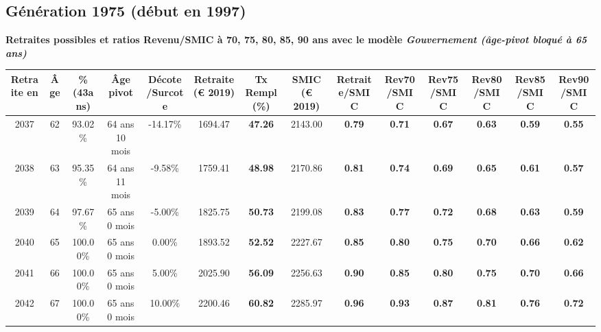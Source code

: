 \subsection{Génération 1975 (début en 1997)} 

{\bf \noindent Retraites possibles et ratios Revenu/SMIC à 70, 75, 80, 85, 90 ans avec le modèle \emph{Gouvernement (âge-pivot bloqué à 65 ans)}}  
 
\begin{adjustbox}{max width=\textwidth} 
\begin{tabular}[htb]{|c|c||c|c|c||c|c||c||c|c|c|c|c|c|} 
\hline 
 Retraite en &  Âge &  \%(43ans) &  Âge pivot &  Décote/Surcote &  Retraite (\euro{} 2019) &  Tx Rempl(\%) &  SMIC (\euro{} 2019) &  Retraite/SMIC &  Rev70/SMIC &  Rev75/SMIC &  Rev80/SMIC &  Rev85/SMIC &  Rev90/SMIC \\ 
\hline \hline 
 2037 &  62 &  93.02\% &  64 ans 10 mois &  -14.17\% &  1694.47 &  {\bf 47.26} &  2143.00 &  {\bf {\color{red} 0.79}} &  {\bf {\color{red} 0.71}} &  {\bf {\color{red} 0.67}} &  {\bf {\color{red} 0.63}} &  {\bf {\color{red} 0.59}} &  {\bf {\color{red} 0.55}} \\ 
\hline 
 2038 &  63 &  95.35\% &  64 ans 11 mois &  -9.58\% &  1759.41 &  {\bf 48.98} &  2170.86 &  {\bf {\color{red} 0.81}} &  {\bf {\color{red} 0.74}} &  {\bf {\color{red} 0.69}} &  {\bf {\color{red} 0.65}} &  {\bf {\color{red} 0.61}} &  {\bf {\color{red} 0.57}} \\ 
\hline 
 2039 &  64 &  97.67\% &  65 ans 0 mois &  -5.00\% &  1825.75 &  {\bf 50.73} &  2199.08 &  {\bf {\color{red} 0.83}} &  {\bf {\color{red} 0.77}} &  {\bf {\color{red} 0.72}} &  {\bf {\color{red} 0.68}} &  {\bf {\color{red} 0.63}} &  {\bf {\color{red} 0.59}} \\ 
\hline 
 2040 &  65 &  100.00\% &  65 ans 0 mois &  0.00\% &  1893.52 &  {\bf 52.52} &  2227.67 &  {\bf {\color{red} 0.85}} &  {\bf {\color{red} 0.80}} &  {\bf {\color{red} 0.75}} &  {\bf {\color{red} 0.70}} &  {\bf {\color{red} 0.66}} &  {\bf {\color{red} 0.62}} \\ 
\hline 
 2041 &  66 &  100.00\% &  65 ans 0 mois &  5.00\% &  2025.90 &  {\bf 56.09} &  2256.63 &  {\bf {\color{red} 0.90}} &  {\bf {\color{red} 0.85}} &  {\bf {\color{red} 0.80}} &  {\bf {\color{red} 0.75}} &  {\bf {\color{red} 0.70}} &  {\bf {\color{red} 0.66}} \\ 
\hline 
 2042 &  67 &  100.00\% &  65 ans 0 mois &  10.00\% &  2200.46 &  {\bf 60.82} &  2285.97 &  {\bf {\color{red} 0.96}} &  {\bf {\color{red} 0.93}} &  {\bf {\color{red} 0.87}} &  {\bf {\color{red} 0.81}} &  {\bf {\color{red} 0.76}} &  {\bf {\color{red} 0.72}} \\ 
\hline 
\hline 
\end{tabular} 
\end{adjustbox} 
 
